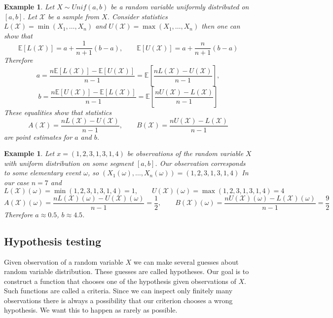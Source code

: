 \documentclass[12pt]{article}
\newtheorem{example}[theorem]{Example}
\begin{document}
\begin{example} Let $X\sim Unif(a, b)$ be a random variable uniformly
    distributed on $[a, b]$. Let $\mathscr{X}$ be a sample from $X$. Consider
    statistics $L(\mathscr{X})=\min(X_1,\ldots,X_n)$ and
    $U(\mathscr{X})=\max(X_1,\ldots,X_n)$ then one can show that
    $$
        \mathbb{E}[L(\mathscr{X})]=a+\frac{1}{n+1}(b-a),
        \quad\quad
        \mathbb{E}[U(\mathscr{X})]=a+\frac{n}{n+1}(b-a)
    $$
    Therefore
    $$
        a=\frac{n\mathbb{E}[L(\mathscr{X})]-\mathbb{E}[U(\mathscr{X})]}{n-1}
        =\mathbb{E}\left[\frac{n L(\mathscr{X})-U(\mathscr{X})}{n-1}\right],
    $$
    $$
        b=\frac{n\mathbb{E}[U(\mathscr{X})]-\mathbb{E}[L(\mathscr{X})]}{n-1}
        =\mathbb{E}\left[\frac{n U(\mathscr{X})-L(\mathscr{X})}{n-1}\right]
    $$
    These equalities show that statistics
    $$
        A(\mathscr{X})=\frac{n L(\mathscr{X})-U(\mathscr{X})}{n-1},
        \quad\quad
        B(\mathscr{X})=\frac{n U(\mathscr{X})-L(\mathscr{X})}{n-1}
    $$
    are point estimates for $a$ and $b$.
\end{example}

\begin{example} Let $x=(1,2,3,1,3,1,4)$ be observations of the random variable
    $X$ with uniform distribution on some segment $[a,b]$. Our observation
    corresponds to some elementary event $\omega$, so
    $(X_1(\omega),\ldots,X_n(\omega))=(1,2,3,1,3,1,4)$ In our case $n=7$ and
    $$
        L(\mathscr{X})(\omega)=\min(1,2,3,1,3,1,4)=1,
        \quad\quad
        U(\mathscr{X})(\omega)=\max(1,2,3,1,3,1,4)=4
    $$
    $$
        A(\mathscr{X})(\omega)=
        \frac{n L(\mathscr{X})(\omega)-U(\mathscr{X})(\omega)}{n-1}=\frac{1}{2},
        \quad\quad
        B(\mathscr{X})(\omega)=
        \frac{n U(\mathscr{X})(\omega)-L(\mathscr{X})(\omega)}{n-1}=\frac{9}{2}
    $$
    Therefore $a\approx 0.5$, $b\approx 4.5$.
\end{example}

\subsection{Hypothesis testing}

Given observation of a random variable $X$ we can make several guesses about
random variable distribution. These guesses are called hypotheses. Our goal is
to construct a function that chooses one of the hypothesis given observations of
$X$. Such functions are called a criteria. Since we can inspect only finitely
many observations there is always a possibility that our criterion chooses a
wrong hypothesis. We want this to happen as rarely as possible.
\end{document}
